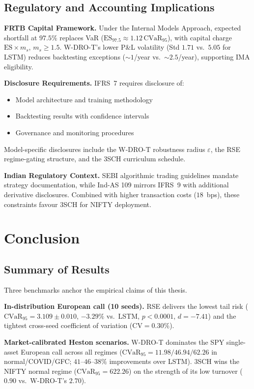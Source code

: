 \documentclass[11pt,oneside]{report}
\newcommand{\cvar}{\mathrm{CVaR}}
\begin{document}
\section{Regulatory and Accounting Implications}
\label{sec:regulatory}

\textbf{FRTB Capital Framework.}
Under the Internal Models Approach, expected shortfall at $97.5\%$ replaces VaR ($\mathrm{ES}_{97.5}\approx1.12\,\mathrm{CVaR}_{95}$), with capital charge $\mathrm{ES}\times m_s$, $m_s\ge1.5$. W-DRO-T’s lower P\&L volatility (Std $1.71$ vs.\ $5.05$ for LSTM) reduces backtesting exceptions ($\sim1$/year vs.\ $\sim2.5$/year), supporting IMA eligibility.

\textbf{Disclosure Requirements.}
IFRS~7 requires disclosure of:
\begin{itemize}[noitemsep]
    \item Model architecture and training methodology
    \item Backtesting results with confidence intervals
    \item Governance and monitoring procedures
\end{itemize}
Model-specific disclosures include the W-DRO-T robustness radius $\varepsilon$, the RSE regime-gating structure, and the 3SCH curriculum schedule.

\textbf{Indian Regulatory Context.}
SEBI algorithmic trading guidelines mandate strategy documentation, while Ind-AS 109 mirrors IFRS~9 with additional derivative disclosures. Combined with higher transaction costs ($18$~bps), these constraints favour 3SCH for NIFTY deployment.
\chapter{Conclusion}
\label{sec:conclusion}

\section{Summary of Results}
\label{sec:results_summary}

Three benchmarks anchor the empirical claims of this thesis.

\textbf{In-distribution European call (10 seeds).} RSE delivers the lowest tail risk ($\cvar_{95} = 3.109 \pm 0.010$, $-3.29\%$ vs.\ LSTM, $p < 0.0001$, $d = -7.41$) and the tightest cross-seed coefficient of variation ($\mathrm{CV} = 0.30\%$).

\textbf{Market-calibrated Heston scenarios.} W-DRO-T dominates the SPY single-asset European call across all regimes ($\cvar_{95} = 11.98 / 46.94 / 62.26$ in normal/COVID/GFC; $41$--$46$--$38\%$ improvements over LSTM). 3SCH wins the NIFTY normal regime ($\cvar_{95} = 622.26$) on the strength of its low turnover ($0.90$ vs.\ W-DRO-T's $2.70$).
\end{document}
